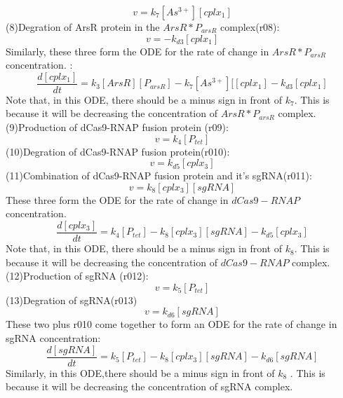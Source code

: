\begin{displaymath}
v=k_7[As^{3+}][cplx_1]
\end{displaymath}
(8)Degration of ArsR protein in the  $ArsR*P_{arsR}$ complex(r08):
\begin{displaymath}
v=-k_{d3}[cplx_1]
\end{displaymath}
Similarly, these three form the ODE for the rate of change in  $ArsR*P_{arsR}$ concentration.  :
\begin{equation}
\frac{d[cplx_1]}{dt}=k_3[ArsR][P_{arsR}]-k_7[As^{3+}][[cplx_1]-k_{d3}[cplx_1] \tag{3}
\end{equation}
Note that, in this ODE, there should be a minus sign in front of $k_7$. This is because it will be decreasing the concentration of  $ArsR*P_{arsR}$ complex.\\
(9)Production of dCas9-RNAP fusion protein (r09):
\begin{displaymath}
v=k_4[P_{tet}]
\end{displaymath}
(10)Degration of dCas9-RNAP fusion protein(r010):
\begin{displaymath}
v=k_{d5}[cplx_3]
\end{displaymath}
(11)Combination of dCas9-RNAP fusion protein and it's sgRNA(r011):
\begin{displaymath}
v=k_{8}[cplx_3][sgRNA]
\end{displaymath}
These three form the ODE for the rate of change in $dCas9-RNAP$ concentration.
\begin{equation}
\frac{d[cplx_3]}{dt}=k_4[P_{tet}]-k_{8}[cplx_3][sgRNA]-k_{d5}[cplx_3] \tag{4}
\end{equation}
Note that, in this ODE, there should be a minus sign in front of $k_8$. This is because it will be decreasing the concentration of  $dCas9-RNAP$ complex.\\
(12)Production of sgRNA (r012):
\begin{displaymath}
v=k_5[P_{tet}]
\end{displaymath}
(13)Degration of sgRNA(r013)
\begin{displaymath}
v=k_{d6}[sgRNA]
\end{displaymath}
These two plus r010 come together to form an ODE for the rate of change in sgRNA concentration:
\begin{equation}
\frac{d[sgRNA]}{dt}=k_5[P_{tet}]-k_{8}[cplx_3][sgRNA]-k_{d6}[sgRNA] \tag{5}
\end{equation}
Similarly, in this ODE,there should be a minus sign in front of $k_8$ . This is because it will be decreasing the concentration of sgRNA complex.\\
